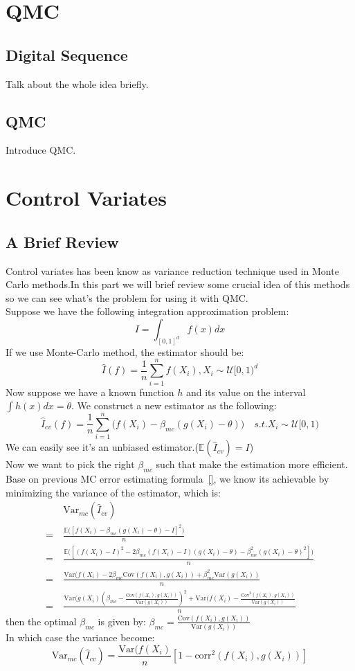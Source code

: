 
\section{QMC}

\subsection{Digital Sequence}
Talk about the whole idea briefly.
\subsection{QMC}
Introduce QMC.


\section{Control Variates}

\subsection{A Brief Review}
Control variates has been know as variance reduction technique used in Monte Carlo methods.In this part we will brief review some crucial idea of this methods so we can see what's the problem for using it with QMC. \\ 
Suppose we have the following integration approximation problem:
\[I= \int_{[0,1]^d}f(x)dx\]
If we use Monte-Carlo method, the estimator should be: 
\[
\hat{I}(f)=\frac{1}{n}\sum_{i=1}^{n}f(X_i), X_i\sim \mathcal{U}[0,1)^d
\]
Now suppose we have a known function $h$ and its value on the interval
$\int h(x)dx = \theta$.
We construct a new estimator as the following: 
\[ \hat{I}_{cv}(f)=\frac{1}{n}\sum_{i=1}^{n}\Big( f(X_i)-\beta_{mc}(g(X_i)-\theta) \Big) \quad s.t. X_i\sim \mathcal{U}[0,1)\]
We can easily see it's an unbiased estimator.($\mathbb{E}(\hat{I}_{cv}) = I$)\\
Now we want to pick the right $\beta_{mc}$ such that make the estimation more efficient. Base on previous MC error estimating formula~\eqref{}, we know its achievable by minimizing the variance of the estimator, which is: 
\begin{align*}
	\quad &\mathrm{Var}_{mc}(\hat{I}_{cv}) \\
	=& \frac{\mathbb{E}\big([f(X_i)-\beta_{mc}(g(X_i)-\theta)-I]^2 \big)}{n} \\
	=& \frac{\mathbb{E}\big([(f(X_i)-I)^2-2\beta_{mc}(f(X_i)-I)(g(X_i)-\theta)-\beta_{mc}^2(g(X_i)-\theta)^2] \big)}{n}\\
	=& \frac{\mathrm{Var}(f(X_i)-2\beta_{mc}\mathrm{Cov}(f(X_i),g(X_i))+\beta_{mc}^2\mathrm{Var}(g(X_i)) }{n}\\
	=& \frac{\mathrm{Var}(g(X_i)(\beta_{mc}-\frac{\mathrm{Cov}(f(X_i),g(X_i))}{\mathrm{Var}(g(X_i))})^2+\mathrm{Var}(f(X_i)-\frac{\mathrm{Cov}^2(f(X_i),g(X_i))}{\mathrm{Var}(g(X_i))} }{n}
\end{align*}
then the optimal $\beta_{mc}$ is given by: 
$\beta_{mc}=\frac{\mathrm{Cov}(f(X_i),g(X_i))}{\mathrm{Var}(g(X_i))}$\\
In which case the variance become:
\[
\mathrm{Var}_{mc}(\hat{I}_{cv})= \frac{\mathrm{Var}(f(X_i)}{n}[1-\mathrm{corr}^2(f(X_i), g(X_i))]
\]

